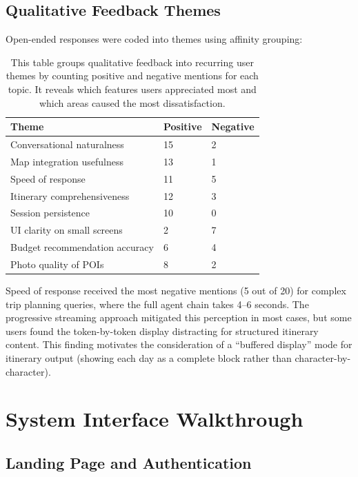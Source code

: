 \documentclass[12pt,a4paper]{report}
\newcommand{\tableexpl}[1]{\caption*{\small #1}}
\begin{document}
\subsection{Qualitative Feedback Themes}

Open-ended responses were coded into themes using affinity grouping:

\begin{table}[H]
\centering
\caption{Qualitative Feedback Theme Frequency (n=20)}
\tableexpl{This table groups qualitative feedback into recurring user themes by counting positive and negative mentions for each topic. It reveals which features users appreciated most and which areas caused the most dissatisfaction.}
\label{tab:qualitative}
\begin{tabular}{lll}
\toprule
\textbf{Theme} & \textbf{Positive} & \textbf{Negative} \\
\midrule
Conversational naturalness        & 15 & 2 \\
Map integration usefulness        & 13 & 1 \\
Speed of response                 & 11 & 5 \\
Itinerary comprehensiveness       & 12 & 3 \\
Session persistence               & 10 & 0 \\
UI clarity on small screens       & 2  & 7 \\
Budget recommendation accuracy    & 6  & 4 \\
Photo quality of POIs             & 8  & 2 \\
\bottomrule
\end{tabular}
\end{table}

Speed of response received the most negative mentions (5 out of 20) for complex trip planning queries, where the full agent chain takes 4--6 seconds. The progressive streaming approach mitigated this perception in most cases, but some users found the token-by-token display distracting for structured itinerary content. This finding motivates the consideration of a ``buffered display'' mode for itinerary output (showing each day as a complete block rather than character-by-character).

\section{System Interface Walkthrough}

\subsection{Landing Page and Authentication}
\end{document}
